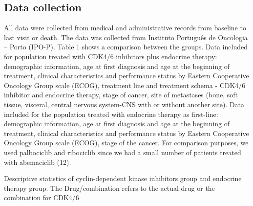 \subsection{Data collection}
All data were collected from medical and administrative records from baseline to last visit or death. The data was collected from Instituto Português de Oncologia – Porto (IPO-P). Table 1 shows a comparison between the groups.
Data included for population treated with CDK4/6 inhibitors plus endocrine therapy: demographic information, age at first diagnosis and age at the beginning of treatment, clinical characteristics and performance status by Eastern Cooperative Oncology Group scale (ECOG), treatment line and treatment schema - CDK4/6 inhibitor and endocrine therapy, stage of cancer, site of metastases (bone, soft tissue, visceral, central nervous system-CNS with or without another site).
Data included for the population treated with endocrine therapy as first-line: demographic information, age at first diagnosis and age at the beginning of treatment, clinical characteristics and performance status by Eastern Cooperative Oncology Group scale (ECOG), stage of the cancer.
For comparison purposes, we used palbociclib and ribociclib since we had a small number of patients treated with abemaciclib (12).
 
\begin{table}
\caption{Descriptive statistics of cyclin-dependent kinase inhibitors group and endocrine therapy group. The Drug/combination refers to the actual drug or the combination for CDK4/6}
\centering
\label{tab:stats_ipop_cdk}

\end{table}





